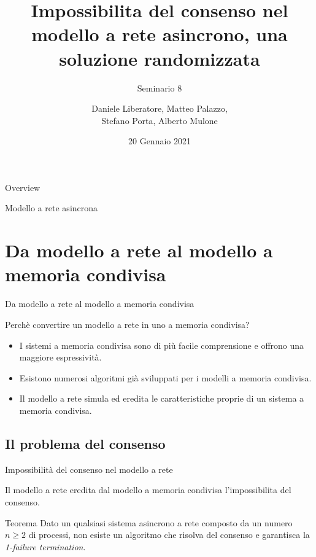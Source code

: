 \documentclass{beamer}
\title{Impossibilita del consenso nel modello a rete asincrono, una soluzione randomizzata}
\subtitle{Seminario 8}
\author{Daniele Liberatore, Matteo Palazzo, \\ Stefano Porta, Alberto Mulone}
\institute{Università degli Studi di Torino}
\date{20 Gennaio 2021}
\begin{document}
\frame{\titlepage}

\begin{frame}{Overview}
    \tableofcontents
\end{frame}


\begin{frame}{Modello a rete asincrona}
    
\end{frame}

\section{Da modello a rete al modello a memoria condivisa}

\begin{frame}{Da modello a rete al modello a memoria condivisa}
    \begin{block}{Perchè convertire un modello a rete in uno a memoria condivisa?}
        \begin{itemize}
            \item I sistemi a memoria condivisa sono di più facile comprensione e offrono una maggiore espressività.
            \item Esistono numerosi algoritmi già sviluppati per i modelli a memoria condivisa.
            \item Il modello a rete simula ed eredita le caratteristiche proprie di un sistema a memoria condivisa.
        \end{itemize}
    \end{block}
\end{frame}

\subsection{Il problema del consenso}

\begin{frame}{Impossibilità del consenso nel modello a rete}

    Il modello a rete eredita dal modello a memoria condivisa l'impossibilita del consenso.

    \begin{block}{Teorema}
        Dato un qualsiasi sistema asincrono a rete composto da un numero $n \geqslant 2$ di processi, non esiste un algoritmo che risolva del consenso e garantisca la \textit{1-failure termination}.
    \end{block}
\end{frame}
\end{document}
